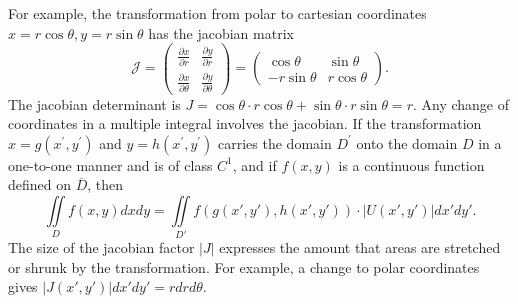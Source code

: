 \documentclass[hazy,blue,11pt]{elegantnote}
\begin{document}
For example, the transformation from polar to cartesian coordinates $x=r\cos \theta , y=r\sin \theta $ has the jacobian matrix
\begin{equation}
    \mathscr{J}=\begin{pmatrix}\frac{\partial x}{\partial r}&\frac{\partial y}{\partial r}\\ \frac{\partial x}{\partial\theta}&\frac{\partial y}{\partial\theta}\end{pmatrix}=\begin{pmatrix}\cos\theta&\sin\theta\\ -r\sin\theta&r\cos\theta\end{pmatrix}.
    \nonumber
\end{equation}
The jacobian determinant is $J=\cos\theta\cdot r\cos\theta+\sin\theta\cdot r\sin\theta=r$.
Any change of coordinates in a multiple integral involves the jacobian. If
the transformation $x=g(x^{\prime},y^{\prime})$ and $y=h(x^{\prime},y^{\prime})$ carries the domain $D^{'}$ onto the domain $D$ in a one-to-one manner and is of class $C^1$, and if $f(x,y)$ is a continuous function defined on $\overline{D}$, then
\begin{equation}
    \iint\limits_D f(x,y)dxdy=\iint\limits_{D'}f(g(x',y'),h(x',y'))\cdot|U(x',y')|dx'dy'.
    \nonumber
\end{equation}
The size of the jacobian factor $\lvert J\rvert$ expresses the amount that areas are stretched or shrunk by the transformation. For example, a change to polar coordinates
gives $|J(x',y')|dx'dy'=rdrd\theta$.
\end{document}
